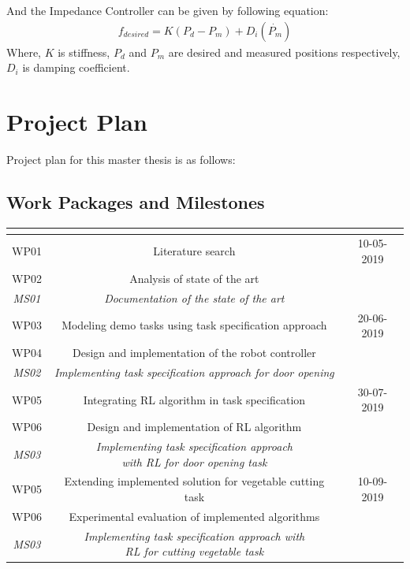 \documentclass[thesis]{mas_proposal}
\begin{document}
And the Impedance Controller can be given by following equation:
\begin{align}
	f_{desired} = K(P_{d} - P_{m}) + D_{i}(\dot{P_{m}})
\end{align}
Where, $K$ is stiffness, $P_{d}$ and $P_{m}$ are desired and measured positions respectively, $D_{i}$ is damping coefficient. 

\chapter{Project Plan}
Project plan for this master thesis is as follows:
\section{Work Packages and Milestones}

\begin{tabular}{|c|c|c|}

	\hline
	\multicolumn{2}{|c|}{\thead{Work Packages}} & \thead{Targeted date} \\
	\hline
	WP01 & Literature search & 10-05-2019 \\
	WP02 & Analysis of state of the art &  \\
	\textit{MS01} & \textit{Documentation of the state of the art} &  \\
	\hline 
	WP03 & Modeling demo tasks using task specification approach &  20-06-2019\\ 
	WP04 & Design and implementation of the robot controller &   \\
	\textit{MS02} & \textit{Implementing task specification approach for door opening} &  \\
	\hline
	WP05 & Integrating RL algorithm in task specification & 30-07-2019 \\ 
	WP06 & Design and implementation of RL algorithm &   \\
	\textit{MS03} & \makecell{\textit{Implementing task specification approach} \\ \textit{with RL for door opening task}} &  \\
	\hline
	WP05 & Extending implemented solution for vegetable cutting task & 10-09-2019 \\ 
	WP06 & Experimental evaluation of implemented algorithms &  \\
	\textit{MS03} & \makecell{\textit{Implementing task specification approach with} \\ \textit{RL for cutting vegetable task}} &  \\
	\hline
\end{tabular}
\end{document}
